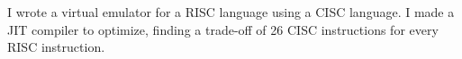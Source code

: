 \documentclass[]{deedy-resume-openfont}
\begin{document}
\begin{minipage}[t]{0.66\textwidth}
\begin{tightemize}
\item I wrote a virtual emulator for a RISC language using a CISC language. I made a JIT compiler to optimize, finding a trade-off of 26 CISC instructions for every RISC instruction.
\end{tightemize}


\end{minipage} 
\end{document}
